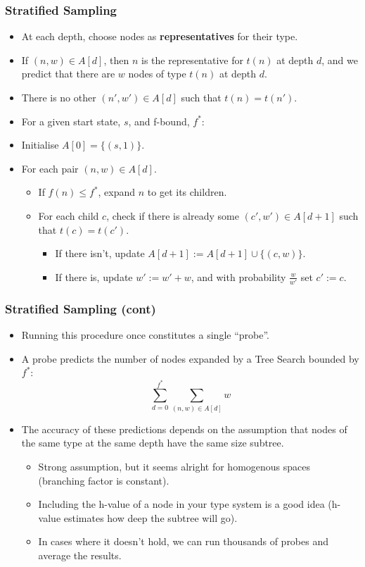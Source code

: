 \documentclass{beamer}
\begin{document}
\begin{frame}
  \frametitle{Stratified Sampling}
  \begin{itemize}
  \item At each depth, choose nodes as \textbf{representatives} for their type.
  \item If \((n,w) \in A[d]\), then \(n\) is the representative for \(t(n)\) at depth \(d\),
    and we predict that there are \(w\) nodes of type \(t(n)\) at depth \(d\).
  \item There is no other \((n',w') \in A[d]\) such that \(t(n) = t(n')\).
  \item For a given start state, \(s\), and f-bound, \(f^*\):
  \item Initialise \(A[0] = \{(s,1)\}\).
  \item For each pair \((n,w) \in A[d]\).
    \begin{itemize}
    \item If \(f(n) \leq f^*\), expand \(n\) to get its children.
    \item For each child \(c\), check if there is already some \((c',w') \in A[d+1]\) such that \(t(c) = t(c')\).
      \begin{itemize}
      \item If there isn't, update \(A[d+1] := A[d+1] \cup \{(c,w)\}\).
      \item If there is, update \(w' := w' + w\), and with probability \(\frac{w}{w'}\) set \(c' := c\).
      \end{itemize}
    \end{itemize}
  \end{itemize}
\end{frame}

\begin{frame}
  \frametitle{Stratified Sampling (cont)}
  \begin{itemize}
  \item Running this procedure once constitutes a single ``probe''.
  
  \item A probe predicts the number of nodes expanded by a Tree Search bounded by \(f^*\):
    $$
    \sum_{d=0}^{f^*} \sum_{(n,w) \in A[d]} w
    $$

  \item The accuracy of these predictions depends on the assumption that
    nodes of the same type at the same depth have the same size subtree.
    \begin{itemize}
    \item Strong assumption, but it seems alright for homogenous spaces (branching factor is constant).
    \item Including the h-value of a node in your type system is a good idea
      (h-value estimates how deep the subtree will go).
    \item In cases where it doesn't hold, we can run thousands of probes and average the results.
    \end{itemize}
  
  \end{itemize}
\end{frame}
\end{document}
